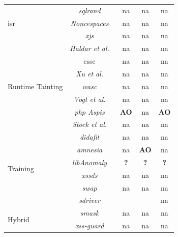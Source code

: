 \documentclass[conference]{IEEEtran}
\newcommand{\tick}{\ding{52}}
\begin{document}
\begin{table}
\begin{threeparttable}
\begin{small}
{\begin{tabular}{l|c|ccc}
  \hline
  \hline
  \multirow{3}{*}{{\sc isr}}
  &   {\it {\sc sql}rand}~\cite{BK04} & {\sc na} & {\sc na} & {\sc na} \\
  &   {\it Noncespaces}~\cite{GC09} & {\sc na} & {\sc na} & {\sc na} \\
  &   {\it x{\sc js}}~\cite{APKLM10} & {\sc na} & {\sc na} & {\sc na} \\
  \hline
  \hline 
	\multirow{7}{*}{Runtime Tainting}
	&  	{\it Haldar et al.}~\cite{HCF05}  & {\sc na} & {\sc na} & {\sc na} \\
  &   {\sc csse}~\cite{PB05} & {\sc na} & {\sc na} & {\sc na} \\
	&  	{\it Xu et al.}~\cite{XBS06}  & {\sc na} & {\sc na} & {\sc na} \\
  &  	{\it {\sc wasc}}~\cite{NLC07} & {\sc na} & {\sc na} & {\sc na} \\
	&  	{\it Vogt et al.}~\cite{VFJKKV07}  & {\sc na} & {\sc na} & {\sc na} \\
	&  	{\it {\sc php} Aspis}~\cite{PMP11} & {\bf AO} & {\sc na} & {\bf AO} \\
	& 	{\it Stock et al.}~\cite{SLMS14} & {\sc na} & {\sc na} & {\sc na} \\
  \hline
  \hline 
  \multirow{6}{*}{Training}
  &   {\it {\sc didafit}}~\cite{LLW02} & {\sc na} & {\sc na} & {\sc na} \\
	&   {\it {\sc amnesia}}~\cite{HO05,HO06,HO05b} & {\sc na} & {\bf AO} & {\sc na} \\
	&   {\it libAnomaly}~\cite{VMV05} & {\bf ?} & {\bf ?} & {\bf ?} \\
	& 	{\it {\sc xssds}}~\cite{JEP08} & {\sc na} & {\sc na} & {\sc na} \\
  & 	{\it {\sc swap}}~\cite{WPLKK09} & {\sc na} & {\sc na} & {\sc na} \\
	& 	{\it {\sc sd}river}~\cite{MS09,MKS09,MKLS11} & \tick & \tick & {\sc na} \\
  \hline
  \hline
  \multirow{4}{*}{Hybrid}
  &   {\it {\sc sm}ask}~\cite{JB07} & {\sc na} & {\sc na} & {\sc na} \\
  &   {\it {\sc xss-guard}}~\cite{BV08} & {\sc na} & {\sc na} & {\sc na} \\

\end{tabular}}
\end{small}
\end{threeparttable}
\end{table}
\end{document}
